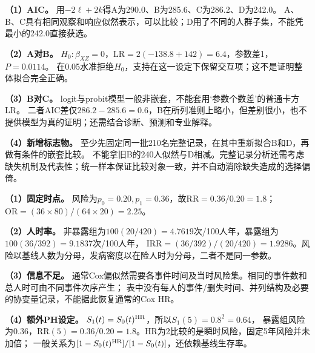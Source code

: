 \textbf{（1）AIC。} 用$-2\ell+2k$得A为290.0、B为285.6、C为286.2、D为242.0。
A、B、C具有相同观察和响应似然表示，可以比较；D用了不同的人群子集，不能凭最小的242.0直接获选。
\par\textbf{（2）A对B。} $H_0:\beta_{XZ}=0$，$\mathrm{LR}=2(-138.8+142)=6.4$，参数差1，$P=0.0114$。
在0.05水准拒绝$H_0$，支持在这一设定下保留交互项；这不是证明整体拟合完全正确。
\par\textbf{（3）B对C。} logit与probit模型一般非嵌套，不能套用‘参数个数差’的普通卡方LR。
二者AIC差仅$286.2-285.6=0.6$，B在所列准则上略小，但差别很小，也不提供模型为真的证明；还需结合诊断、预测和专业解释。
\par\textbf{（4）新增标志物。} 至少先固定同一批210名完整记录，在其中重新拟合B和D，再做有条件的嵌套比较。
不能拿旧B的240人似然与D相减。完整记录分析还需考虑缺失机制及代表性；统一样本保证比较对象一致，并不自动消除缺失造成的选择偏倚。
\par\nobreak\smallskip{}

\textbf{（1）固定时点。} 风险为$p_0=0.20,p_1=0.36$，故$\mathrm{RR}=0.36/0.20=1.8$；
$\mathrm{OR}=(36\times80)/(64\times20)=2.25$。
\par\textbf{（2）人时率。} 非暴露组为$100(20/420)=4.7619$次/100人年，暴露组为$100(36/392)=9.1837$次/100人年，
$\mathrm{IRR}=(36/392)/(20/420)=1.9286$。风险以基线人数为分母，发病密度以在险人时为分母，二者不是同一参数。
\par\textbf{（3）信息不足。} 通常Cox偏似然需要各事件时间及当时风险集。相同的事件数和总人时可由不同事件次序产生；
表中没有每人的事件/删失时间、并列结构及必要的协变量记录，不能据此恢复通常的Cox HR。
\par\textbf{（4）额外PH设定。} $S_1(t)=S_0(t)^{\rm HR}$，所以$S_1(5)=0.8^2=0.64$，
暴露组风险为0.36，$\mathrm{RR}(5)=0.36/0.20=1.8$。HR为2比较的是瞬时风险，固定5年风险并未加倍；
一般关系为$[1-S_0(t)^{\rm HR}]/[1-S_0(t)]$，还依赖基线生存率。
\par\nobreak\smallskip{}

